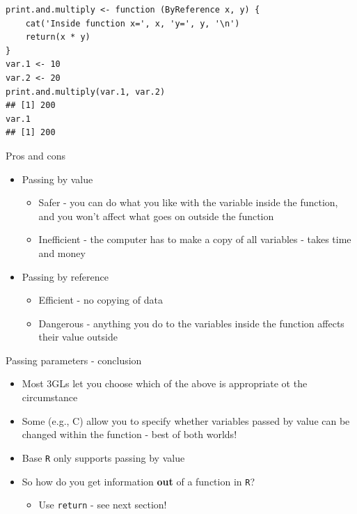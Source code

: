 \documentclass[ignorenonframetext,]{beamer}
\providecommand{\tightlist}{%
  \setlength{\itemsep}{0pt}\setlength{\parskip}{0pt}}
\begin{document}
\begin{frame}[fragile]

\begin{verbatim}
print.and.multiply <- function (ByReference x, y) {
    cat('Inside function x=', x, 'y=', y, '\n')
    return(x * y)
}
var.1 <- 10
var.2 <- 20
print.and.multiply(var.1, var.2)
## [1] 200
var.1
## [1] 200
\end{verbatim}

\end{frame}

\begin{frame}{Pros and cons}

\begin{itemize}[<+->]
\tightlist
\item
  Passing by value

  \begin{itemize}[<+->]
  \tightlist
  \item
    Safer - you can do what you like with the variable inside the
    function, and you won't affect what goes on outside the function
  \item
    Inefficient - the computer has to make a copy of all variables -
    takes time and money
  \end{itemize}
\item
  Passing by reference

  \begin{itemize}[<+->]
  \tightlist
  \item
    Efficient - no copying of data
  \item
    Dangerous - anything you do to the variables inside the function
    affects their value outside
  \end{itemize}
\end{itemize}

\end{frame}

\begin{frame}[fragile]{Passing parameters - conclusion}

\begin{itemize}[<+->]
\tightlist
\item
  Most 3GLs let you choose which of the above is appropriate ot the
  circumstance
\item
  Some (e.g., C) allow you to specify whether variables passed by value
  can be changed within the function - best of both worlds!
\item
  Base \texttt{R} only supports passing by value
\item
  So how do you get information \textbf{out} of a function in
  \texttt{R}?

  \begin{itemize}[<+->]
  \tightlist
  \item
    Use \texttt{return} - see next section!
  \end{itemize}
\end{itemize}

\end{frame}
\end{document}
